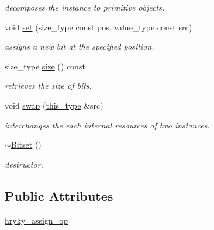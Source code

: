 \begin{DoxyCompactItemize}
\begin{DoxyCompactList}\small\item\em decomposes the instance to primitive objects. \end{DoxyCompactList}\item 
\hypertarget{classhryky_1_1_bitset_ac46ed5d5d5c98106ac330796a146d2a1}{void \hyperlink{classhryky_1_1_bitset_ac46ed5d5d5c98106ac330796a146d2a1}{set} (size\-\_\-type const pos, value\-\_\-type const src)}\label{classhryky_1_1_bitset_ac46ed5d5d5c98106ac330796a146d2a1}

\begin{DoxyCompactList}\small\item\em assigns a new bit at the specified position. \end{DoxyCompactList}\item 
\hypertarget{classhryky_1_1_bitset_a0d41c36d998c4e7bbd1c3d12b9ea199c}{size\-\_\-type \hyperlink{classhryky_1_1_bitset_a0d41c36d998c4e7bbd1c3d12b9ea199c}{size} () const }\label{classhryky_1_1_bitset_a0d41c36d998c4e7bbd1c3d12b9ea199c}

\begin{DoxyCompactList}\small\item\em retrieves the size of bits. \end{DoxyCompactList}\item 
\hypertarget{classhryky_1_1_bitset_a85e9dae700136067e615b385ea8f4e14}{void \hyperlink{classhryky_1_1_bitset_a85e9dae700136067e615b385ea8f4e14}{swap} (\hyperlink{classhryky_1_1_bitset_a967bec88789e12e2ca96e7a73907822c}{this\-\_\-type} \&src)}\label{classhryky_1_1_bitset_a85e9dae700136067e615b385ea8f4e14}

\begin{DoxyCompactList}\small\item\em interchanges the each internal resources of two instances. \end{DoxyCompactList}\item 
\hypertarget{classhryky_1_1_bitset_ae6c8e0fd6959e423f6307cb71b74b595}{\hyperlink{classhryky_1_1_bitset_ae6c8e0fd6959e423f6307cb71b74b595}{$\sim$\-Bitset} ()}\label{classhryky_1_1_bitset_ae6c8e0fd6959e423f6307cb71b74b595}

\begin{DoxyCompactList}\small\item\em destructor. \end{DoxyCompactList}\end{DoxyCompactItemize}
\subsection*{Public Attributes}
\begin{DoxyCompactItemize}
\item 
\hyperlink{classhryky_1_1_bitset_add97c3079f3c0f0ee7b39c40a4c8d498}{hryky\-\_\-assign\-\_\-op}
\end{DoxyCompactItemize}


